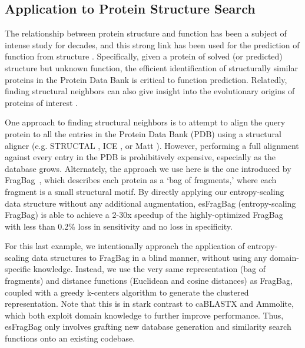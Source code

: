 \documentclass[review,preprint,12pt]{elsarticle}
\renewcommand{\cite}{\citep} %
\theoremstyle{definition}
\theoremstyle{remark}
\numberwithin{equation}{section}
\begin{document}
\subsection{Application to Protein Structure Search}

The relationship between protein structure and function has been a subject of intense study for decades,
and this strong link has been used for the prediction of function from structure \cite{hegyi1999relationship}.
Specifically, given a protein of solved (or predicted) structure but unknown function, the efficient identification
of structurally similar proteins in the Protein Data Bank is critical to function prediction.
Relatedly, finding structural neighbors can also give insight into the evolutionary origins of proteins of interest \cite{yona1999protomap,nepomnyachiy2014global}.

One approach to finding structural neighbors is to attempt to align the query protein to all the entries in the Protein Data Bank (PDB) using a structural aligner (e.g. STRUCTAL \cite{subbiah1993structural}, ICE \cite{shindyalov1998protein}, or Matt \cite{menke2008matt}).
However, performing a full alignment against every entry in the PDB is prohibitively expensive, especially as the database grows.
Alternately, the approach we use here is the one introduced by FragBag~\cite{budowski2010fragbag}, which describes each protein as a
`bag of fragments,' where each fragment is a small structural motif.
By directly applying our entropy-scaling data structure without any additional augmentation, esFragBag (entropy-scaling FragBag) is able to achieve a 2-30x speedup of the highly-optimized FragBag with less than 0.2\% loss in sensitivity and no loss in specificity.

For this last example, we intentionally approach the application of entropy-scaling data structures to FragBag in a blind manner,
without using any domain-specific knowledge.
Instead, we use the very same representation (bag of fragments) and distance functions (Euclidean and cosine distances)
as FragBag, coupled with a greedy k-centers algorithm to generate the clustered representation.
Note that this is in stark contrast to caBLASTX and Ammolite, which both exploit domain knowledge to further improve performance.
Thus, esFragBag only involves grafting new database generation and similarity search functions onto an existing codebase.
\end{document}
